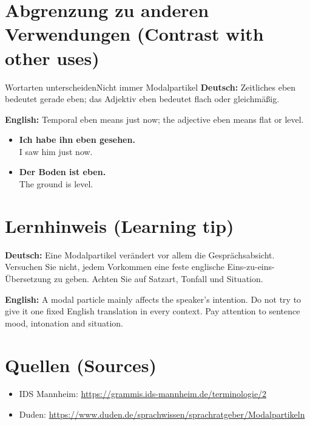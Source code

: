 \documentclass[a4paper,11pt]{article}
\newcommand{\GermanText}[1]{\textbf{Deutsch: }#1\par}
\newcommand{\EnglishText}[1]{{\small\color{SoftGray}\textbf{English: }#1\par}}
\newcommand{\ExampleItem}[2]{\item \textbf{#1}\\{\small\color{SoftGray}#2}}
\begin{document}
\section{Abgrenzung zu anderen Verwendungen \textnormal{(Contrast with other uses)}}
\begin{grammarentry}{Wortarten unterscheiden}{Nicht immer Modalpartikel}
\GermanText{Zeitliches eben bedeutet gerade eben; das Adjektiv eben bedeutet flach oder gleichmäßig.}
\EnglishText{Temporal eben means just now; the adjective eben means flat or level.}
\end{grammarentry}
\begin{exbox}\begin{itemize}
\ExampleItem{Ich habe ihn eben gesehen.}{I saw him just now.}
\ExampleItem{Der Boden ist eben.}{The ground is level.}
\end{itemize}\end{exbox}
\section{Lernhinweis \textnormal{(Learning tip)}}
\GermanText{Eine Modalpartikel verändert vor allem die Gesprächsabsicht. Versuchen Sie nicht, jedem Vorkommen eine feste englische Eins-zu-eins-Übersetzung zu geben. Achten Sie auf Satzart, Tonfall und Situation.}
\EnglishText{A modal particle mainly affects the speaker's intention. Do not try to give it one fixed English translation in every context. Pay attention to sentence mood, intonation and situation.}
\section{Quellen \textnormal{(Sources)}}
\begin{itemize}
\item IDS Mannheim: \url{https://grammis.ids-mannheim.de/terminologie/2}
\item Duden: \url{https://www.duden.de/sprachwissen/sprachratgeber/Modalpartikeln}
\end{itemize}
\end{document}
